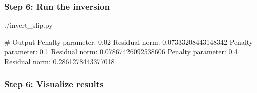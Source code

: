 \documentclass[aspectratio=169]{beamer}
\begin{document}
\begin{frame}[fragile]
  \frametitle{Step 6: Run the inversion}
  \summary{}

\begin{bashcode}
  ./invert_slip.py

  # Output
  Penalty parameter:  0.02
  Residual norm:      0.07333208443148342
  Penalty parameter:  0.1
  Residual norm:      0.07867426092538606
  Penalty parameter:  0.4
  Residual norm:      0.2861278443377018
\end{bashcode}
  
\end{frame}


\begin{frame}
  \frametitle{Step 6: Visualize results}

  
\end{frame}

\end{document}
